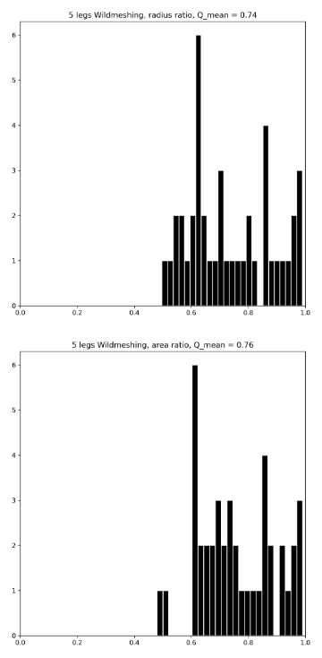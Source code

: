 \documentclass[acmtog]{acmart}
\begin{document}
\begin{figure}[H]
  \centering
  \begin{subfigure}{0.22\textwidth}
    \centering
    \includegraphics[width=\textwidth]{Images/histograms/5 legs Wildmeshing, radius ratio .png}
  \end{subfigure}\hfill
  \begin{subfigure}{0.22\textwidth}
    \centering
    \includegraphics[width=\textwidth]{Images/histograms/5 legs Wildmeshing, area ratio .png}

\end{subfigure}
\end{figure}
\end{document}
